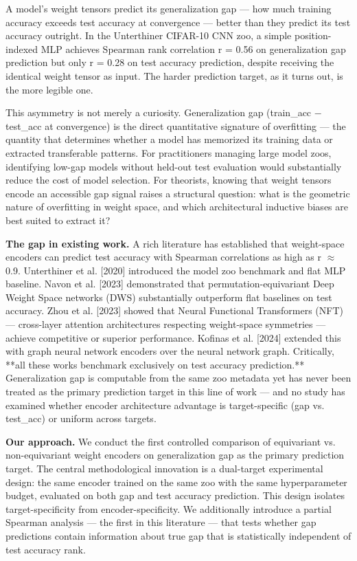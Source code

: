 
A model's weight tensors predict its generalization gap --- how much training accuracy exceeds test accuracy
at convergence --- better than they predict its test accuracy outright. In the Unterthiner CIFAR-10 CNN zoo,
a simple position-indexed MLP achieves Spearman rank correlation r = 0.56 on generalization gap prediction
but only r = 0.28 on test accuracy prediction, despite receiving the identical weight tensor as input.
The harder prediction target, as it turns out, is the more legible one.

This asymmetry is not merely a curiosity. Generalization gap (train\_acc $-$ test\_acc at convergence) is the
direct quantitative signature of overfitting --- the quantity that determines whether a model has memorized
its training data or extracted transferable patterns. For practitioners managing large model zoos, identifying
low-gap models without held-out test evaluation would substantially reduce the cost of model selection. For
theorists, knowing that weight tensors encode an accessible gap signal raises a structural question: what
is the geometric nature of overfitting in weight space, and which architectural inductive biases are best
suited to extract it?

\textbf{The gap in existing work.} A rich literature has established that weight-space encoders can predict test
accuracy with Spearman correlations as high as r $\approx$ 0.9. Unterthiner et al. [2020] introduced the model zoo
benchmark and flat MLP baseline. Navon et al. [2023] demonstrated that permutation-equivariant Deep Weight
Space networks (DWS) substantially outperform flat baselines on test accuracy. Zhou et al. [2023] showed
that Neural Functional Transformers (NFT) --- cross-layer attention architectures respecting weight-space
symmetries --- achieve competitive or superior performance. Kofinas et al. [2024] extended this with graph
neural network encoders over the neural network graph. Critically, **all these works benchmark exclusively
on test accuracy prediction.** Generalization gap is computable from the same zoo metadata yet has never
been treated as the primary prediction target in this line of work --- and no study has examined whether
encoder architecture advantage is target-specific (gap vs. test\_acc) or uniform across targets.

\textbf{Our approach.} We conduct the first controlled comparison of equivariant vs. non-equivariant weight
encoders on generalization gap as the primary prediction target. The central methodological innovation is
a dual-target experimental design: the same encoder trained on the same zoo with the same hyperparameter
budget, evaluated on both gap and test accuracy prediction. This design isolates target-specificity from
encoder-specificity. We additionally introduce a partial Spearman analysis --- the first in this literature ---
that tests whether gap predictions contain information about true gap that is statistically independent of
test accuracy rank.

